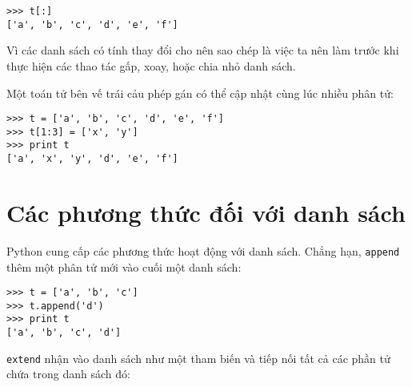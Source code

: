 \documentclass[11pt]{book}
\begin{document}

\beforeverb
\begin{verbatim}
>>> t[:]
['a', 'b', 'c', 'd', 'e', 'f']
\end{verbatim}
\afterverb
%
Vì các danh sách có tính thay đổi cho nên sao chép là việc
ta nên làm trước khi thực hiện các thao tác gấp, xoay, hoặc
chia nhỏ danh sách.


Một toán tử bên vế trái cảu phép gán có thể cập nhật cùng lúc
nhiều phân tử:


\beforeverb
\begin{verbatim}
>>> t = ['a', 'b', 'c', 'd', 'e', 'f']
>>> t[1:3] = ['x', 'y']
>>> print t
['a', 'x', 'y', 'd', 'e', 'f']
\end{verbatim}
\afterverb
%


%

%


\section{Các phương thức đối với danh sách}


Python cung cấp các phương thức hoạt động với danh sách. Chẳng hạn,
{\tt append} thêm một phân tử mới vào cuối một danh sách:


\beforeverb
\begin{verbatim}
>>> t = ['a', 'b', 'c']
>>> t.append('d')
>>> print t
['a', 'b', 'c', 'd']
\end{verbatim}
\afterverb
%
{\tt extend} nhận vào danh sách như một tham biến và tiếp nối tất cả
các phần tử chứa trong danh sách đó:
\end{document}
